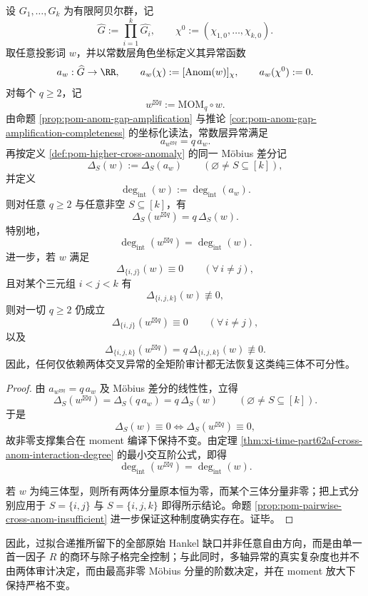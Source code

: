 \begin{theorem}\label{thm:xi-time-part62af-moment-interaction-degree-rigidity}
设 \(G_1,\dots,G_k\) 为有限阿贝尔群，记
\[
\widehat G:=\prod_{i=1}^{k}\widehat{G_i},
\qquad
\chi^0:=(\chi_{1,0},\dots,\chi_{k,0}).
\]
取任意投影词 \(w\)，并以常数层角色坐标定义其异常函数
\[
a_w:\widehat G\to \RR,
\qquad
a_w(\chi):=[\mathrm{Anom}(w)]_\chi,
\qquad
a_w(\chi^0):=0.
\]
对每个 \(q\ge 2\)，记
\[
w^{\boxtimes q}:=\mathrm{MOM}_q\circ w.
\]
由命题 \ref{prop:pom-anom-gap-amplification} 与推论
\ref{cor:pom-anom-gap-amplification-completeness} 的坐标化读法，常数层异常满足
\[
a_{w^{\boxtimes q}}=q\,a_w.
\]
再按定义 \ref{def:pom-higher-cross-anomaly} 的同一 Möbius 差分记
\[
\Delta_S(w):=\Delta_S(a_w)
\qquad
(\varnothing\neq S\subseteq [k]),
\]
并定义
\[
\deg_{\mathrm{int}}(w):=\deg_{\mathrm{int}}(a_w).
\]
则对任意 \(q\ge 2\) 与任意非空 \(S\subseteq [k]\)，有
\[
\boxed{\;
\Delta_S(w^{\boxtimes q})=q\,\Delta_S(w).\;}
\]
特别地，
\[
\boxed{\;
\deg_{\mathrm{int}}(w^{\boxtimes q})
=
\deg_{\mathrm{int}}(w).\;}
\]
进一步，若 \(w\) 满足
\[
\Delta_{\{i,j\}}(w)\equiv 0
\qquad
(\forall\, i\neq j),
\]
且对某个三元组 \(i<j<k\) 有
\[
\Delta_{\{i,j,k\}}(w)\not\equiv 0,
\]
则对一切 \(q\ge 2\) 仍成立
\[
\Delta_{\{i,j\}}(w^{\boxtimes q})\equiv 0
\qquad
(\forall\, i\neq j),
\]
以及
\[
\Delta_{\{i,j,k\}}(w^{\boxtimes q})
=
q\,\Delta_{\{i,j,k\}}(w)
\not\equiv 0.
\]
因此，任何仅依赖两体交叉异常的全矩阶审计都无法恢复这类纯三体不可分性。
\end{theorem}
\begin{proof}
由
\(
a_{w^{\boxtimes q}}=q\,a_w
\)
及 Möbius 差分的线性性，立得
\[
\Delta_S(w^{\boxtimes q})
=
\Delta_S(q\,a_w)
=
q\,\Delta_S(w)
\qquad
(\varnothing\neq S\subseteq [k]).
\]
于是
\[
\Delta_S(w)\equiv 0
\iff
\Delta_S(w^{\boxtimes q})\equiv 0,
\]
故非零支撑集合在 moment 编译下保持不变。由定理
\ref{thm:xi-time-part62af-cross-anom-interaction-degree} 的最小交互阶公式，即得
\[
\deg_{\mathrm{int}}(w^{\boxtimes q})
=
\deg_{\mathrm{int}}(w).
\]

若 \(w\) 为纯三体型，则所有两体分量原本恒为零，而某个三体分量非零；把上式分别应用于 \(S=\{i,j\}\) 与 \(S=\{i,j,k\}\) 即得所示结论。命题
\ref{prop:pom-pairwise-cross-anom-insufficient} 进一步保证这种制度确实存在。证毕。
\end{proof}

\noindent
因此，过拟合递推所留下的全部原始 Hankel 缺口并非任意自由方向，而是由单一首一因子 \(R\) 的商环与除子格完全控制；与此同时，多轴异常的真实复杂度也并不由两体审计决定，而由最高非零 Möbius 分量的阶数决定，并在 moment 放大下保持严格不变。

\endinput

